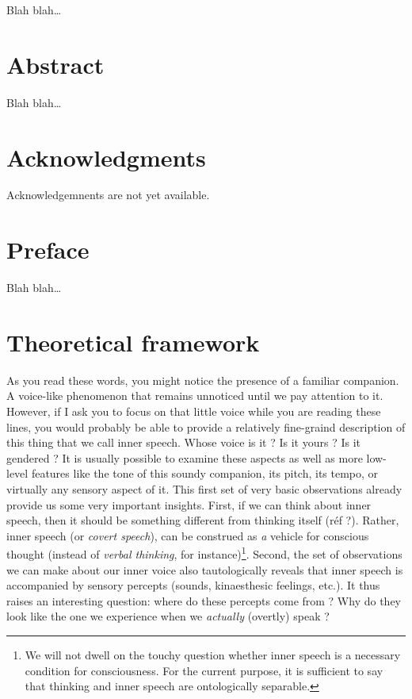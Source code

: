 \documentclass[a4paper,11pt,oneside,oldfontcommands]{memoir}
\let\rmarkdownfootnote\footnote%
\def\footnote{\protect\rmarkdownfootnote}
\newcommand{\initial}[1]{
	\lettrine[lines=3,lhang=0.33,nindent=0em]{
		\color{gray}
     		{\textsc{#1}}}{}}
\begin{document}
\initial{B}lah blah\ldots{}

\chapter*{Abstract}\label{abstract}

\initial{B}lah blah\ldots{}

\chapter*{Acknowledgments}\label{acknowledgments}

\initial{A}cknowledgemnents are not yet available.

\chapter*{Preface}\label{preface}

\initial{B}lah blah\ldots{}

\chapter{Theoretical framework}\label{intro}


\initial{A}s you read these words, you might notice the presence of a
familiar companion. A voice-like phenomenon that remains unnoticed until
we pay attention to it. However, if I ask you to focus on that little
voice while you are reading these lines, you would probably be able to
provide a relatively fine-graind description of this thing that we call
inner speech. Whose voice is it ? Is it yours ? Is it gendered ? It is
usually possible to examine these aspects as well as more low-level
features like the tone of this soundy companion, its pitch, its tempo,
or virtually any sensory aspect of it. This first set of very basic
observations already provide us some very important insights. First, if
we can think about inner speech, then it should be something different
from thinking itself (réf ?). Rather, inner speech (or \emph{covert
speech}), can be construed as \emph{a} vehicle for conscious thought
(instead of \emph{verbal thinking}, for instance)\footnote{We will not
  dwell on the touchy question whether inner speech is a necessary
  condition for consciousness. For the current purpose, it is sufficient
  to say that thinking and inner speech are ontologically separable.}.
Second, the set of observations we can make about our inner voice also
tautologically reveals that inner speech is accompanied by sensory
percepts (sounds, kinaesthesic feelings, etc.). It thus raises an
interesting question: where do these percepts come from ? Why do they
look like the one we experience when we \emph{actually} (overtly) speak
?
\end{document}
